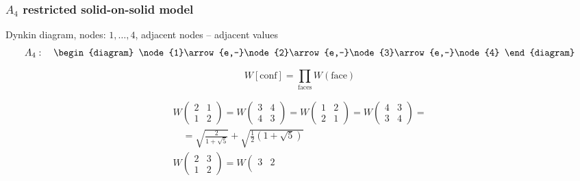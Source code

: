 \documentclass[pdftex]{beamer}
\theoremstyle{definition} \newtheorem{Def}{Definition}
\begin{document}
\begin{frame}
  \frametitle{$A_4$  restricted solid-on-solid model}
  Dynkin diagram, nodes: $1,\dots,4$, adjacent nodes -- adjacent values
  \begin{equation}
    \label{eq:4}
    A_4:\quad
    \begin{diagram}
      \node{1}\arrow{e,-}\node{2}\arrow{e,-}\node{3}\arrow{e,-}\node{4}
    \end{diagram}
  \end{equation}

  \begin{equation}
    \label{eq:3}
    W[\mathrm{conf}]=\prod_{\mathrm{faces}} W(\mathrm{face})
  \end{equation}

   \begin{equation}
     \label{eq:12}
     \begin{array}{l}
       W\left(                                          
         \begin{array}{cc}
           2 & 1 \\
           1 & 2
         \end{array}
       \right)=
       W\left(
         \begin{array}{cc}
           3 & 4 \\
           4 & 3
         \end{array}
       \right)=   W\left(                                         
         \begin{array}{cc}
           1 & 2 \\
           2 & 1
         \end{array}
       \right)= 
       W\left(                                                  
         \begin{array}{cc}
           4 & 3 \\
           3 & 4
         \end{array}
       \right)=\\\quad=\sqrt{\frac{2}{1+\sqrt{5}}}+\sqrt{\frac{1}{2}\left(1+\sqrt{5}\right)}\\
 W\left(                                      
           \begin{array}{cc}
             2 & 3 \\
             1 & 2
           \end{array}
         \right)=
         W\left(                                         
           \begin{array}{cc}
             3 & 2 \\

\end{array}
\end{array}
\end{equation}
\end{frame}
\end{document}

